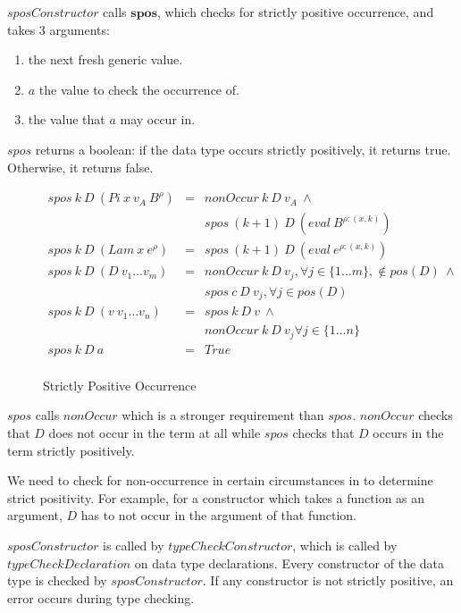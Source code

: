 $sposConstructor$ calls $\boldsymbol{spos}$, which checks for strictly positive occurrence, and takes 3 arguments:

\begin{enumerate}
  \item the next fresh generic value.
  \item $a$ the value to check the occurrence of.
  \item the value that $a$ may occur in.
\end{enumerate}

$spos$ returns a boolean: if the data type occurs strictly positively, it returns true. Otherwise, it returns false.

\begin{figure}[H]
  \begin{equation*}
    \begin{aligned}
      spos \: k \: D \: (Pi \: x \: v_A \: B^{\rho}) & = & nonOccur \: k \: D \: v_A \: \land                                             \\
                                                     &   & spos \: (k+1) \: D \: (eval \: B^{\rho:(x,k)})                                 \\
      spos \: k \: D \: (Lam \: x \: e^{\rho})       & = & spos \: (k+1) \: D \: (eval \: e^{\rho:(x,k)})                                 \\
      spos \: k \: D \: (D \: v_1 \dots v_m)         & = & nonOccur \: k \: D \: v_j, \forall j \in \{1 \dots m\}, \notin pos(D) \: \land \\
                                                     &   & spos \: c \: D \: v_j, \forall j \in pos(D)                                    \\
      spos \: k \: D \: (v \: v_1 \dots v_n)         & = & spos \: k \: D \: v \: \land                                                   \\
                                                     &   & nonOccur \: k \: D \: v_j \forall j \in \{1 \dots n\}                          \\
      spos \: k \: D \: a                            & = & True                                                                           \\
    \end{aligned}
  \end{equation*}
  \caption{Strictly Positive Occurrence}
\end{figure}

$spos$ calls $nonOccur$ which is a stronger requirement than $spos$. $nonOccur$ checks that $D$ does not occur in the term at all while $spos$ checks that $D$ occurs in the term strictly positively.

We need to check for non-occurrence in certain circumstances in to determine strict positivity. For example, for a constructor which takes a function as an argument, $D$ has to not occur in the argument of that function.

$sposConstructor$ is called by $typeCheckConstructor$, which is called by $typeCheckDeclaration$ on data type declarations. Every constructor of the data type is checked by $sposConstructor$. If any constructor is not strictly positive, an error occurs during type checking.